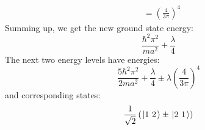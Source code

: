 \documentclass[../Main.tex]{subfiles}
\begin{document}
\begin{example}
\begin{align*}
        &= \left(\frac{4}{3\pi}\right)^4
    \end{align*}
    Summing up, we get the new ground state energy:
    \begin{equation*}
        \frac{\hbar^2 \pi^2}{ma^2} + \frac{\lambda}{4}
    \end{equation*}
    The next two energy levels have energies:
    \begin{equation*}
        \frac{5\hbar^2 \pi^2}{2ma^2} + \frac{\lambda}{4} \pm \lambda \left(\frac{4}{3\pi}\right)^4
    \end{equation*}
    and corresponding states:
    \begin{equation*}
        \frac1{\sqrt{2}} \left(\left.\left|1~2\right.\right\rangle \pm \left.\left|2~1\right.\right\rangle\right)
    \end{equation*}
\end{example}
\end{document}
